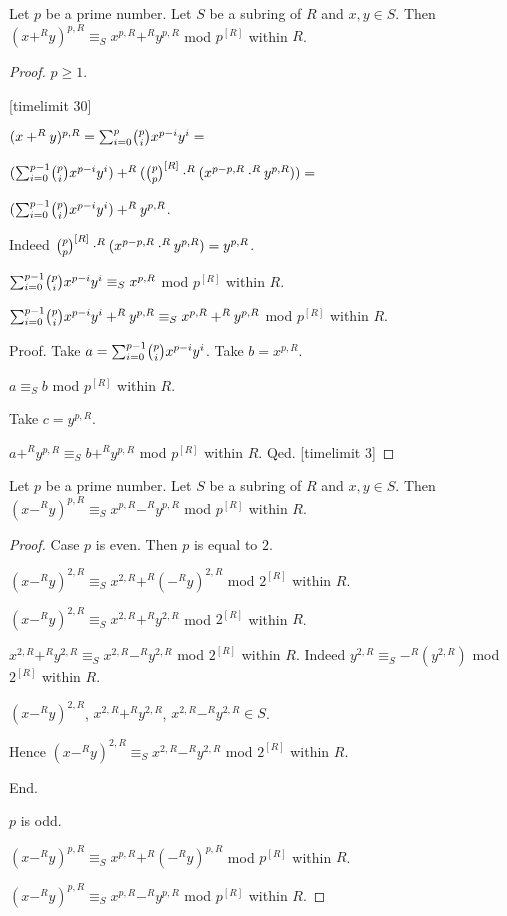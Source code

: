 \documentclass[11pt]{article}
\begin{document}
\begin{forthel}
\begin{lemma} Let $p$ be a prime number.
Let $S$ be a subring of $R$ and $x,y \in S$. 
Then $(x +^{R} y)^{p,R} \equiv_{S} x^{p,R} +^{R} y^{p,R}$ mod $p^{[R]}$ within $R$.
\end{lemma}

\begin{proof} $p \geq 1$.

[timelimit 30]

$(x +^{R} y)^{p,R} =  \binsum{p}{p}{x}{y}{R} =$

$ (\binsum{p-1}{p}{x}{y}{R}) +^{R} (\cho{p}{p}^{[R]} \cdot^{R} (x^{p - p,R} \cdot^{R} y^{p,R})) =$

$ (\binsum{p-1}{p}{x}{y}{R}) +^{R} y^{p,R}$.

Indeed $\cho{p}{p}^{[R]} \cdot^{R} (x^{p - p,R} \cdot^{R} y^{p,R}) = y^{p,R}$.

$ \binsum{p-1}{p}{x}{y}{R} \equiv_{S} x^{p,R}$ mod $p^{[R]}$ within $R$.

$ \binsum{p-1}{p}{x}{y}{R} +^{R} y^{p,R} \equiv_{S} x^{p,R} +^{R} y^{p,R}$ mod $p^{[R]}$ within $R$.

Proof.
Take $a = \binsum{p-1}{p}{x}{y}{R}$.
Take $b = x^{p,R}$. 

$a \equiv_{S} b $ mod $p^{[R]}$ within $R$.

Take $c = y^{p,R}$.

$a +^{R} y^{p,R} \equiv_{S} b +^{R} y^{p,R} $ mod $p^{[R]}$ within $R$.
Qed.
[timelimit 3]
\end{proof}

\begin{lemma} Let $p$ be a prime number.
Let $S$ be a subring of $R$ and $x,y \in S$. 
Then $(x -^{R} y)^{p,R} \equiv_{S} x^{p,R} -^{R} y^{p,R}$ mod $p^{[R]}$ within $R$.
\end{lemma}
\begin{proof}

Case $p$ is even. Then $p$ is equal to $2$.

$(x -^{R} y)^{2,R} \equiv_{S} x^{2,R} +^{R} (-^{R}y)^{2,R}$ mod $2^{[R]}$ within $R$.

$(x -^{R} y)^{2,R} \equiv_{S} x^{2,R} +^{R} y^{2,R}$ mod $2^{[R]}$ within $R$.

$x^{2,R} +^{R} y^{2,R} \equiv_{S} x^{2,R} -^{R} y^{2,R}$ mod $2^{[R]}$ within $R$.
Indeed $y^{2,R} \equiv_{S} -^{R}(y^{2,R})$ mod $2^{[R]}$ within $R$.

$(x -^{R} y)^{2,R}$, $x^{2,R} +^{R} y^{2,R}$, 
$x^{2,R} -^{R} y^{2,R} \in S$.

Hence $(x -^{R} y)^{2,R} \equiv_{S} x^{2,R} -^{R} y^{2,R}$ mod $2^{[R]}$ within $R$.

End. 

$p$ is odd.

$(x -^{R} y)^{p,R} \equiv_{S} x^{p,R} +^{R} (-^{R}y)^{p,R}$ mod $p^{[R]}$ within $R$.

$(x -^{R} y)^{p,R} \equiv_{S} x^{p,R} -^{R} y^{p,R}$ mod $p^{[R]}$ within $R$.
\end{proof}
\end{forthel}
\end{document}
